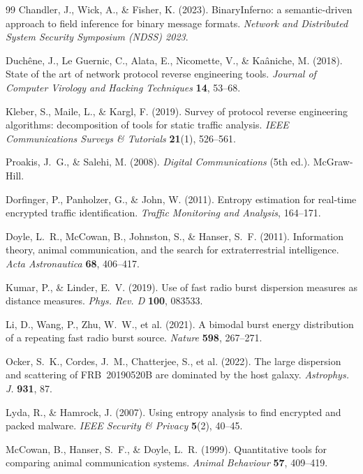 \documentclass[11pt,a4paper]{article}
\begin{document}
\begin{thebibliography}{99}
 Chandler, J., Wick, A., \& Fisher, K. (2023). BinaryInferno: a
semantic-driven approach to field inference for binary message formats. \emph{Network
and Distributed System Security Symposium (NDSS) 2023}.

 Duchêne, J., Le Guernic, C., Alata, E., Nicomette, V., \&
Kaâniche, M. (2018). State of the art of network protocol reverse engineering tools.
\emph{Journal of Computer Virology and Hacking Techniques} \textbf{14}, 53--68.

 Kleber, S., Maile, L., \& Kargl, F. (2019). Survey of protocol
reverse engineering algorithms: decomposition of tools for static traffic analysis.
\emph{IEEE Communications Surveys \& Tutorials} \textbf{21}(1), 526--561.

 Proakis, J.~G., \& Salehi, M. (2008). \emph{Digital
Communications} (5th ed.). McGraw-Hill.

 Dorfinger, P., Panholzer, G., \& John, W. (2011). Entropy
estimation for real-time encrypted traffic identification. \emph{Traffic Monitoring and
Analysis}, 164--171.

 Doyle, L.~R., McCowan, B., Johnston, S., \& Hanser, S.~F. (2011).
Information theory, animal communication, and the search for extraterrestrial
intelligence. \emph{Acta Astronautica} \textbf{68}, 406--417.

 Kumar, P., \& Linder, E.~V. (2019). Use of fast radio
burst dispersion measures as distance measures. \emph{Phys. Rev. D} \textbf{100},
083533.

 Li, D., Wang, P., Zhu, W.~W., et al. (2021). A bimodal burst energy
distribution of a repeating fast radio burst source. \emph{Nature} \textbf{598},
267--271.

 Ocker, S.~K., Cordes, J.~M., Chatterjee, S., et al. (2022). The
large dispersion and scattering of FRB~20190520B are dominated by the host galaxy.
\emph{Astrophys. J.} \textbf{931}, 87.

 Lyda, R., \& Hamrock, J. (2007). Using entropy analysis to find
encrypted and packed malware. \emph{IEEE Security \& Privacy} \textbf{5}(2), 40--45.

 McCowan, B., Hanser, S.~F., \& Doyle, L.~R. (1999). Quantitative
tools for comparing animal communication systems. \emph{Animal Behaviour} \textbf{57},
409--419.


\end{thebibliography}
\end{document}
